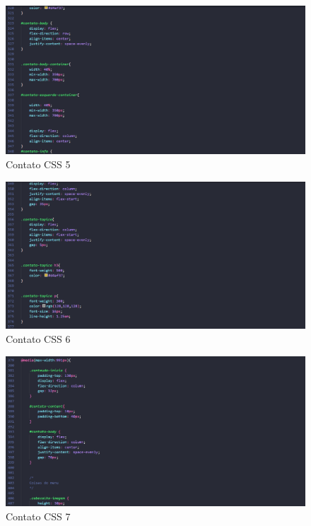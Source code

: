 \begin{figure}[!h]
	\centering
	\includegraphics[width=15cm]{Contato CSS 5}
	\caption{Contato CSS 5}
\end{figure}

\begin{figure}[!h]
	\centering
	\includegraphics[width=15cm]{Contato CSS 6}
	\caption{Contato CSS 6}
\end{figure}

\begin{figure}[!h]
	\centering
	\includegraphics[width=15cm]{Contato CSS 7}
	\caption{Contato CSS 7}
\end{figure}

